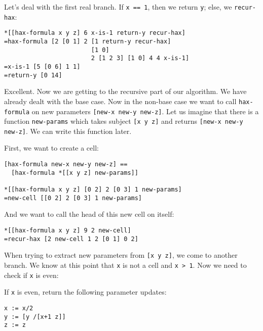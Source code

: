 \documentclass[twoside]{article}
\begin{document}
Let's deal with the first real branch.  If \lstinline[style=inlinecode]{x == 1}, then we return \lstinline[style=inlinecode]{y}; else, we \lstinline[style=inlinecode]{recur-hax}:

\begin{lstlisting}[style=listingblock]
*[[hax-formula x y z] 6 x-is-1 return-y recur-hax]
=hax-formula [2 [0 1] 2 [1 return-y recur-hax]
                        [1 0]
                        2 [1 2 3] [1 0] 4 4 x-is-1]
=x-is-1 [5 [0 6] 1 1]
=return-y [0 14]
\end{lstlisting}

Excellent. Now we are getting to the recursive part of our algorithm. We have already dealt with the base case. Now in the non-base case we want to call \lstinline[style=inlinecode]{hax-formula} on new parameters \lstinline[style=inlinecode]{[new-x new-y new-z]}. Let us imagine that there is a function \lstinline[style=inlinecode]{new-params} which takes subject \lstinline[style=inlinecode]{[x y z]} and returns \lstinline[style=inlinecode]{[new-x new-y new-z]}.  We can write this function later.

First, we want to create a cell:

\begin{lstlisting}[style=listingblock]
[hax-formula new-x new-y new-z] ==
  [hax-formula *[[x y z] new-params]]

*[[hax-formula x y z] [0 2] 2 [0 3] 1 new-params]
=new-cell [[0 2] 2 [0 3] 1 new-params]
\end{lstlisting}

\noindent
And we want to call the head of this new cell on itself:

\begin{lstlisting}[style=listingblock]
*[[hax-formula x y z] 9 2 new-cell]
=recur-hax [2 new-cell 1 2 [0 1] 0 2]
\end{lstlisting}

When trying to extract new parameters from \lstinline[style=inlinecode]{[x y z]}, we come to another branch. We know at this point that \lstinline[style=inlinecode]{x} is not a cell and \lstinline[style=inlinecode]{x > 1}. Now we need to check if \lstinline[style=inlinecode]{x} is even:

If \lstinline[style=inlinecode]{x} is even, return the following parameter updates:

\begin{lstlisting}[style=listingblock]
x := x/2
y := [y /[x+1 z]]
z := z
\end{lstlisting}
\end{document}
